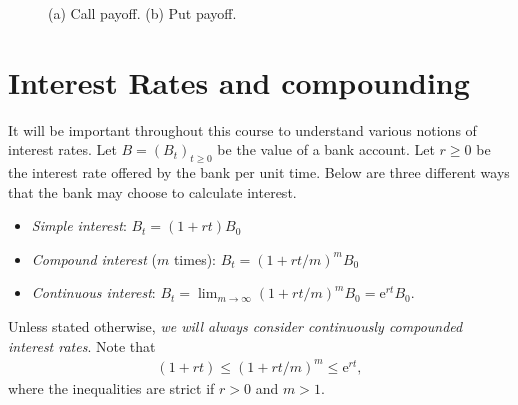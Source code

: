 \documentclass[12pt]{book}
\numberwithin{equation}{chapter}
\theoremstyle{plain}
\numberwithin{theorem}{section}
\theoremstyle{definition}
\numberwithin{exercise}{chapter}
\newcommand{\<}{\langle}
\renewcommand{\>}{\rangle}
\renewcommand{\(}{\left(}
\renewcommand{\)}{\right)}
\renewcommand{\[}{\left[}
\renewcommand{\]}{\right]}
\newcommand\ee{\mathrm{e}}
\newcommand{\zeroline}[1]{%
  \draw[zeroline] (axis cs:\pgfkeysvalueof{/pgfplots/xmin},0) -- (axis cs:\pgfkeysvalueof{/pgfplots/xmax},0) node[right] {#1};
  \node[left] at (axis cs:\pgfkeysvalueof{/pgfplots/xmin},0) {$0$};}
\theoremstyle{definition}
\numberwithin{question}{section}
\begin{document}
\begin{figure}
    \centering
    \qquad
{}
    \caption{(a) Call payoff. (b) Put payoff.\label{fig:plot1_4}}
\end{figure}

\section{Interest Rates and compounding}
It will be important throughout this course to understand various notions of interest rates.
Let $B = (B_t)_{t \geq 0}$ be the value of a bank account.
Let $r \geq 0$ be the interest rate offered by the bank per unit time.
Below are three different ways that the bank may choose to calculate interest.
\begin{itemize}
	\item \textit{Simple interest}: $B_t = (1 + rt) B_0$
	\item \textit{Compound interest} ($m$ times): $B_t = (1 + rt/m)^m B_0$
	\item \textit{Continuous interest}: $B_t = \lim_{m \rightarrow \infty} (1 + rt/m)^m B_0 = \ee^{rt} B_0$.
\end{itemize}
Unless stated otherwise, \textit{we will always consider continuously compounded interest rates}.  Note that
\begin{align}
(1 + rt) \leq (1 + rt/m)^m \leq \ee^{rt} ,
\end{align}
where the inequalities are strict if $r>0$ and $m > 1$.
\end{document}
